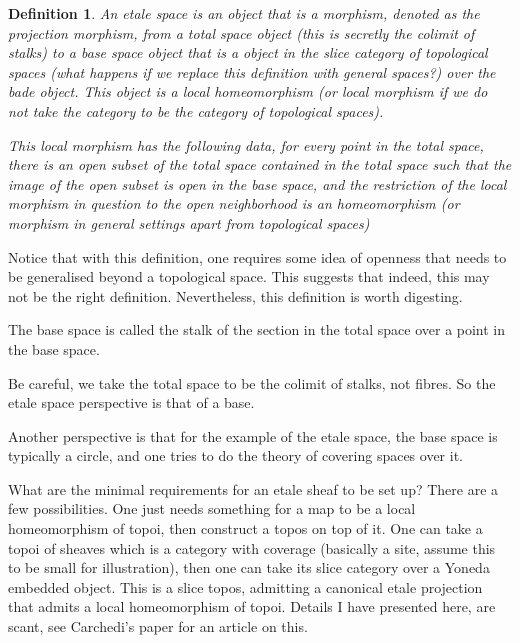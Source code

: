 \documentclass[12pt]{article}
\newtheorem{definition}{Definition}
\begin{document}
\begin{definition}
An etale space is an object that is a morphism, denoted as the projection morphism, from a total space object (this is secretly the colimit of stalks) to a base space object that is a object in the slice category of topological spaces (what happens if we replace this definition with general spaces?) over the bade object. This object is a local homeomorphism (or local morphism if we do not take the category to be the category of topological spaces).

This local morphism has the following data, for every point in the total space, there is an open subset of the total space contained in the total space such that the image of the open subset is open in the base space, and the restriction of the local morphism in question to the open neighborhood is an homeomorphism (or morphism in general settings apart from topological spaces)
\end{definition}

Notice that with this definition, one requires some idea of openness that needs to be generalised beyond a topological space. This suggests that indeed, this may not be the right definition. Nevertheless, this definition is worth digesting.

The base space is called the stalk of the section in the total space over a point in the base space.

Be careful, we take the total space to be the colimit of stalks, not fibres. So the etale space perspective is that of a base.

Another perspective is that for the example of the etale space, the base space is typically a circle, and one tries to do the theory of covering spaces over it.

What are the minimal requirements for an etale sheaf to be set up? There are a few possibilities. One just needs something for a map to be a local homeomorphism of topoi, then construct a topos on top of it. One can take a topoi of sheaves which is a category with coverage (basically a site, assume this to be small for illustration), then one can take its slice category over a Yoneda embedded object. This is a slice topos, admitting a canonical etale projection that admits a local homeomorphism of topoi. Details I have presented here, are scant, see Carchedi's paper for an article on this.
\end{document}
